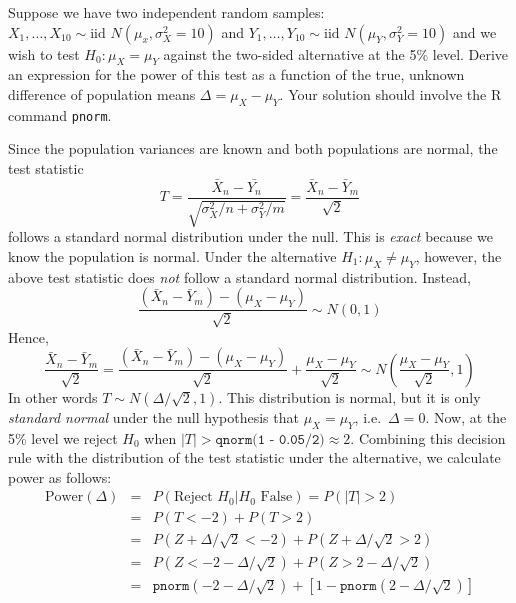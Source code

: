 \documentclass[addpoints,12pt]{exam}
\begin{document}
\begin{questions}
\question[30] Suppose we have two independent random samples: $X_1, \hdots, X_{10} \sim \mbox{iid } N(\mu_x, \sigma_X^2 = 10)$ and $Y_1, \hdots, Y_{10} \sim \mbox{iid } N(\mu_Y, \sigma_Y^2 = 10)$
and we wish to test $H_0\colon \mu_X = \mu_Y$ against the two-sided alternative at the 5\% level. 
Derive an expression for the power of this test as a function of the true, unknown difference of population means $\Delta = \mu_X - \mu_Y$.
Your solution should involve the R command \texttt{pnorm}. 
\begin{solution}[4in]
			Since the population variances are known and both populations are normal, the test statistic
				$$T = \frac{\bar{X}_n - \bar{Y_n}}{\sqrt{\sigma_X^2/n + \sigma_Y^2/m}} = \frac{\bar{X}_n - \bar{Y}_m}{\sqrt{2}}$$
			follows a standard normal distribution under the null. This is \emph{exact} because we know the population is normal. Under the alternative $H_1\colon \mu_X \neq \mu_Y$, however, the above test statistic does \emph{not} follow a standard normal distribution. Instead,
					$$\frac{(\bar{X}_n - \bar{Y}_m) - (\mu_X - \mu_Y)}{\sqrt{2}}  \sim N(0,1)$$
					Hence, 
					$$\frac{\bar{X}_n - \bar{Y}_m}{\sqrt{2}} = \frac{(\bar{X}_n - \bar{Y}_m) - (\mu_X - \mu_Y)}{\sqrt{2}}  + \frac{\mu_X - \mu_Y}{\sqrt{2}}  \sim N\left(\frac{\mu_X - \mu_Y}{\sqrt{2}} , 1\right)$$
					In other words $T \sim N(\Delta/\sqrt{2}, 1)$. This distribution is normal, but it is only \emph{standard normal} under the null hypothesis that $\mu_X = \mu_Y$, i.e.\ $\Delta = 0$. 
		Now, at the 5\% level we reject $H_0$ when $|T| > \texttt{qnorm(1 - 0.05/2)}\approx 2$.
					Combining this decision rule with the distribution of the test statistic under the alternative, we calculate power as follows:
					\begin{eqnarray*}
						\mbox{Power}(\Delta) &=& P(\mbox{Reject } H_0|H_0 \mbox{ False})= P(|T|>2)\\
            &=& P(T < -2) + P(T > 2) \\
            &=& P(Z + \Delta/\sqrt{2} < -2) +P(Z + \Delta/\sqrt{2} > 2)\\
            &=& P(Z < -2 - \Delta/\sqrt{2}) +P(Z> 2 - \Delta/\sqrt{2})\\
            &=& \texttt{pnorm}(-2 - \Delta/\sqrt{2}) + \left[1 - \texttt{pnorm}(2 - \Delta/\sqrt{2})\right]
					\end{eqnarray*}
			\end{solution}


\end{questions}
\end{document}
